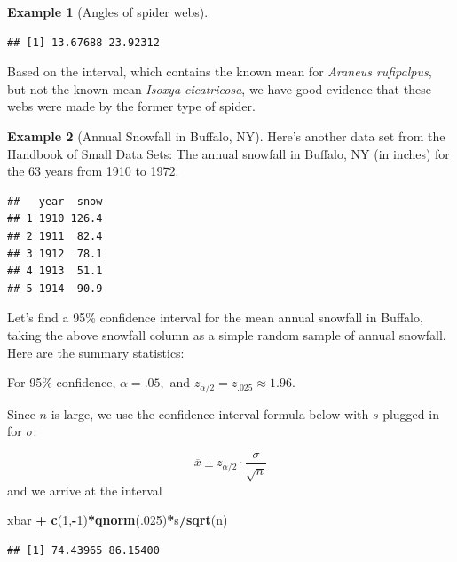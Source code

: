 \documentclass[
]{book}
\newenvironment{Shaded}{\begin{snugshade}}{\end{snugshade}}
\newcommand{\CommentTok}[1]{\textcolor[rgb]{0.56,0.35,0.01}{\textit{#1}}}
\newcommand{\DecValTok}[1]{\textcolor[rgb]{0.00,0.00,0.81}{#1}}
\newcommand{\FunctionTok}[1]{\textcolor[rgb]{0.13,0.29,0.53}{\textbf{#1}}}
\newcommand{\NormalTok}[1]{#1}
\newcommand{\OtherTok}[1]{\textcolor[rgb]{0.56,0.35,0.01}{#1}}
\newcommand{\SpecialCharTok}[1]{\textcolor[rgb]{0.81,0.36,0.00}{\textbf{#1}}}
\theoremstyle{definition}
\theoremstyle{definition}
\newtheorem{example}{Example}[chapter]
\theoremstyle{definition}
\theoremstyle{definition}
\theoremstyle{remark}
\begin{document}
\begin{example}[Angles of spider webs]
\begin{verbatim}
## [1] 13.67688 23.92312
\end{verbatim}

Based on the interval, which contains the known mean for \emph{Araneus rufipalpus}, but not the known mean \emph{Isoxya cicatricosa}, we have good evidence that these webs were made by the former type of spider.
\end{example}

\begin{example}[Annual Snowfall in Buffalo, NY]

Here's another data set from the Handbook of Small Data Sets: The annual snowfall in Buffalo, NY (in inches) for the 63 years from 1910 to 1972.

\begin{verbatim}
##   year  snow
## 1 1910 126.4
## 2 1911  82.4
## 3 1912  78.1
## 4 1913  51.1
## 5 1914  90.9
\end{verbatim}

Let's find a 95\% confidence interval for the mean annual snowfall in Buffalo, taking the above snowfall column as a simple random sample of annual snowfall. Here are the summary statistics:

\begin{Shaded}
\end{Shaded}

For 95\% confidence, \(\alpha = .05,\) and \(z_{\alpha/2} = z_{.025} \approx 1.96.\)

Since \(n\) is large, we use the confidence interval formula below with \(s\) plugged in for \(\sigma\):

\[\overline{x} \pm z_{\alpha/2} \cdot  \frac{\sigma}{\sqrt{n}}\]
and we arrive at the interval

\begin{Shaded}
\begin{Highlighting}[]
\NormalTok{xbar }\SpecialCharTok{+} \FunctionTok{c}\NormalTok{(}\DecValTok{1}\NormalTok{,}\SpecialCharTok{{-}}\DecValTok{1}\NormalTok{)}\SpecialCharTok{*}\FunctionTok{qnorm}\NormalTok{(.}\DecValTok{025}\NormalTok{)}\SpecialCharTok{*}\NormalTok{s}\SpecialCharTok{/}\FunctionTok{sqrt}\NormalTok{(n)}
\end{Highlighting}
\end{Shaded}

\begin{verbatim}
## [1] 74.43965 86.15400
\end{verbatim}

\end{example}
\end{document}
